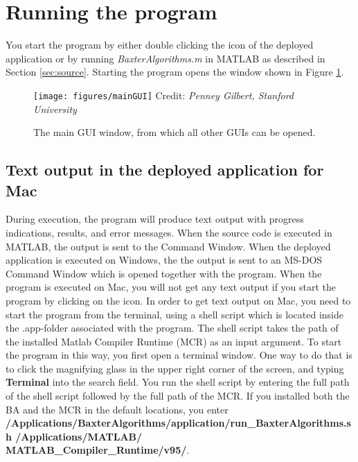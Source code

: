 \documentclass[a4paper, oneside, onecolumn, 11pt]{article}
\newcommand{\file}[1]{\emph{#1}}
\newcommand{\command}[1]{\textbf{#1}}
\newcommand{\credit}[1]{\raggedleft \scriptsize Credit:\emph{ #1}}
\begin{document}
\section{Running the program}
You start the program by either double clicking the icon of the deployed application or by running \file{BaxterAlgorithms.m} in MATLAB as described in Section \ref{sec:source}. Starting the program opens the window shown in Figure \ref{fig:main-GUI}.

\begin{figure}[!ht]
\begin{center}
\texttt{[image: figures/mainGUI]}
\credit{Penney Gilbert, Stanford University}
\caption{The main GUI window, from which all other GUIs can be opened.}
\label{fig:main-GUI}
\end{center}
\end{figure}

\subsection{Text output in the deployed application for Mac}
\label{sec:mac-terminal}
During execution, the program will produce text output with progress indications, results, and error messages. When the source code is executed in MATLAB, the output is sent to the Command Window. When the deployed application is executed on Windows, the the output is sent to an MS-DOS Command Window which is opened together with the program. When the program is executed on Mac, you will not get any text output if you start the program by clicking on the icon. In order to get text output on Mac, you need to start the program from the terminal, using a shell script which is located inside the .app-folder associated with the program. The shell script takes the path of the installed Matlab Compiler Runtime (MCR) as an input argument. To start the program in this way, you first open a terminal window. One way to do that is to click the magnifying glass in the upper right corner of the screen, and typing \command{Terminal} into the search field. You run the shell script by entering the full path of the shell script followed by the full path of the MCR. If you installed both the BA and the MCR in the default locations, you enter \command{/\mbox{Applications}/\allowbreak BaxterAlgorithms/\allowbreak \mbox{application}/\allowbreak run\_BaxterAlgorithms.sh \allowbreak/\mbox{Applications}/\allowbreak MATLAB/\allowbreak\\ MATLAB\_Compiler\_Runtime/\allowbreak v95/}.
\end{document}
